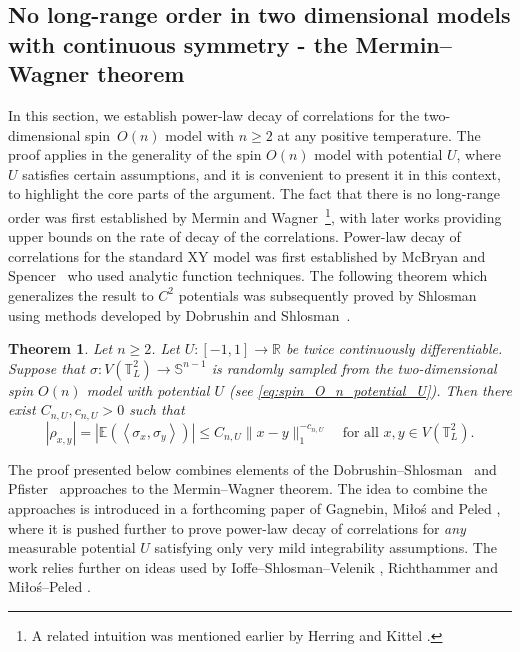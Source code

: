 \documentclass[12pt,reqno]{article}
\def\R{\mathbb{R}}
\def\E{\mathbb{E}}
\def\T{\mathbb{T}}
\newtheorem{theorem}{Theorem}[section]
\begin{document}
\subsection{No long-range order in two dimensional models with continuous symmetry - the Mermin--Wagner theorem}\label{sec:Mermin-Wagner}
In this section, we establish power-law decay of correlations for
the two-dimensional spin~$O(n)$ model with $n\ge 2$ at any positive
temperature. The proof applies in the generality of the spin $O(n)$
model with potential $U$, where $U$ satisfies certain assumptions,
and it is convenient to present it in this context, to highlight the
core parts of the argument. The fact that there is no long-range order was first established by Mermin and Wagner~\cite{mermin1966absence, mermin1967absence}\footnote{A related intuition was mentioned earlier by Herring and Kittel \cite[Footnote 8a]{herring1951theory}.}, with later works providing upper bounds on the rate of decay of the correlations. Power-law decay of correlations for the standard XY model was first established by McBryan and Spencer~\cite{McBSpe77} who used analytic function techniques. The following theorem which generalizes the result to $C^2$ potentials was subsequently proved
by Shlosman \cite{shlosman1978decrease} using methods developed by Dobrushin and Shlosman~\cite{dobrushin1975absence}.
\begin{theorem}\label{thm:Mermin_Wagner_with_potential}
Let $n\ge 2$. Let $U:[-1,1]\to\R$ be twice continuously differentiable.
Suppose that $\sigma:V(\T_L^2)\to\mathbb S^{n-1}$ is
randomly sampled from the two-dimensional spin $O(n)$ model with
potential $U$ (see \eqref{eq:spin_O_n_potential_U}). Then there exist $C_{n,U}, c_{n,U}>0$ such that
\begin{equation}\label{eq:Mermin_Wagner_to_prove}
  |\rho_{x,y}|=|\E(\left\langle\sigma_x,\sigma_y\right\rangle)| \le C_{n,U}\|x-y\|_1^{-c_{n,U}}\quad\text{for all $x,y\in V(\T_L^2)$}.
\end{equation}
\end{theorem}
The proof presented below combines elements of the
Dobrushin--Shlosman~\cite{dobrushin1975absence} and Pfister~\cite{pfister1981symmetry} approaches to the Mermin--Wagner
theorem. The idea to combine the approaches is introduced in a
forthcoming paper of Gagnebin, Mi\l o\'s and Peled \cite{Gagnebin2018},
where it is pushed further to prove power-law decay of correlations
for \emph{any} measurable potential $U$ satisfying only very mild integrability
assumptions. The work \cite{Gagnebin2018} relies further on ideas used
by Ioffe--Shlosman--Velenik \cite{ioffe20022d}, Richthammer \cite{richthammer2007translation} and Mi\l o\'s--Peled \cite{milos2015delocalization}.
\end{document}
